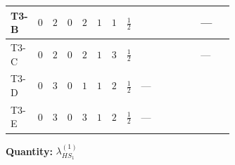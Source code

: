 \documentclass[8pt]{article}
\begin{document}
\begin{landscape}
\begin{longtable}{@{}llcccccc >{\raggedright\arraybackslash}p{0.21\linewidth} >{\raggedright\arraybackslash}p{0.21\linewidth} >{\raggedright\arraybackslash}p{0.21\linewidth}@{}}
T3-B & $0$ & $2$ & $0$ & $2$ & $1$ & $1$ & $\frac{1}{2}$ & \scriptsize\adjustbox{max width=\linewidth}{$\begin{gathered} {\lambda_{HS_1}^{(1)}} (6 \operatorname{Tr}\!\left({Y_d}\,\left({Y_d}\right)^{\dagger}\right)+2 \operatorname{Tr}\!\left({Y_e}\,\left({Y_e}\right)^{\dagger}\right)+6 \operatorname{Tr}\!\left({Y_u}\,\left({Y_u}\right)^{\dagger}\right))\end{gathered}$} & \scriptsize\adjustbox{max width=\linewidth}{$\begin{gathered} +6 {\lambda_5} \left({\lambda_5}\right)^{*}\end{gathered}$} & --- \\
\midrule
T3-C & $0$ & $2$ & $0$ & $2$ & $1$ & $3$ & $\frac{1}{2}$ & \scriptsize\adjustbox{max width=\linewidth}{$\begin{gathered} {\lambda_{HS_1}^{(1)}} (6 \operatorname{Tr}\!\left({Y_d}\,\left({Y_d}\right)^{\dagger}\right)+2 \operatorname{Tr}\!\left({Y_e}\,\left({Y_e}\right)^{\dagger}\right)+6 \operatorname{Tr}\!\left({Y_u}\,\left({Y_u}\right)^{\dagger}\right))\end{gathered}$} & \scriptsize\adjustbox{max width=\linewidth}{$\begin{gathered} +6 {\lambda_5} \left({\lambda_5}\right)^{*}\end{gathered}$} & --- \\
\midrule
T3-D & $0$ & $3$ & $0$ & $1$ & $1$ & $2$ & $\frac{1}{2}$ & --- & \scriptsize\adjustbox{max width=\linewidth}{$\begin{gathered} +4 {\lambda_5} \left({\lambda_5}\right)^{*}\end{gathered}$} & \scriptsize\adjustbox{max width=\linewidth}{$\begin{gathered} -\frac{33 {g_2}^2 {\lambda_{HS_1}^{(1)}}}{2}\end{gathered}$} \\
\midrule
T3-E & $0$ & $3$ & $0$ & $3$ & $1$ & $2$ & $\frac{1}{2}$ & --- & \scriptsize\adjustbox{max width=\linewidth}{$\begin{gathered} +4 {\lambda_5} \left({\lambda_5}\right)^{*}\end{gathered}$} & \scriptsize\adjustbox{max width=\linewidth}{$\begin{gathered} -\frac{33 {g_2}^2 {\lambda_{HS_1}^{(1)}}}{2}\end{gathered}$} \\
\midrule
\bottomrule
\end{longtable}
\clearpage
\noindent\textbf{Quantity: }$\lambda_{HS_1}^{(1)}$\par\smallskip

\end{landscape}
\end{document}
